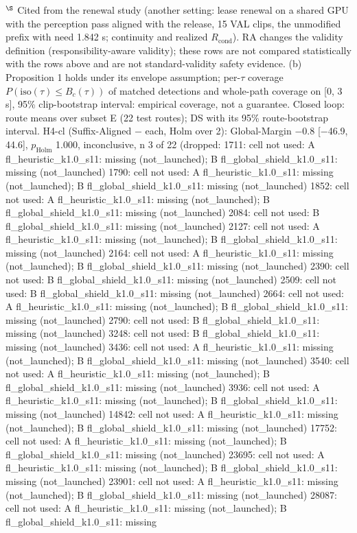 \begin{table}[t]
{$^\S$ Cited from the renewal study (another setting: lease renewal on a shared GPU with the perception pass aligned with the release, 15 VAL clips, the unmodified prefix with need 1.842 s; continuity and realized $R_\mathrm{cond}$). RA changes the validity definition (responsibility-aware validity); these rows are not compared statistically with the rows above and are not standard-validity safety evidence. 
(b) Proposition 1 holds under its envelope assumption; per-$\tau$ coverage $P(\mathrm{iso}(\tau) \le B_c(\tau))$ of matched detections and whole-path coverage on [0, 3 s], 95\% clip-bootstrap interval: empirical coverage, not a guarantee. 
Closed loop: route means over subset E (22 test routes); DS with its 95\% route-bootstrap interval. H4-cl (Suffix-Aligned $-$ each, Holm over 2): Global-Margin $-$0.8 [$-$46.9, 44.6], $p_\mathrm{Holm}$ 1.000, inconclusive, n 3 of 22 (dropped: 1711: cell not used: A fl\_heuristic\_k1.0\_s11: missing (not\_launched); B fl\_global\_shield\_k1.0\_s11: missing (not\_launched) \textbar{} 1790: cell not used: A fl\_heuristic\_k1.0\_s11: missing (not\_launched); B fl\_global\_shield\_k1.0\_s11: missing (not\_launched) \textbar{} 1852: cell not used: A fl\_heuristic\_k1.0\_s11: missing (not\_launched); B fl\_global\_shield\_k1.0\_s11: missing (not\_launched) \textbar{} 2084: cell not used: B fl\_global\_shield\_k1.0\_s11: missing (not\_launched) \textbar{} 2127: cell not used: A fl\_heuristic\_k1.0\_s11: missing (not\_launched); B fl\_global\_shield\_k1.0\_s11: missing (not\_launched) \textbar{} 2164: cell not used: A fl\_heuristic\_k1.0\_s11: missing (not\_launched); B fl\_global\_shield\_k1.0\_s11: missing (not\_launched) \textbar{} 2390: cell not used: B fl\_global\_shield\_k1.0\_s11: missing (not\_launched) \textbar{} 2509: cell not used: B fl\_global\_shield\_k1.0\_s11: missing (not\_launched) \textbar{} 2664: cell not used: A fl\_heuristic\_k1.0\_s11: missing (not\_launched); B fl\_global\_shield\_k1.0\_s11: missing (not\_launched) \textbar{} 2790: cell not used: B fl\_global\_shield\_k1.0\_s11: missing (not\_launched) \textbar{} 3248: cell not used: B fl\_global\_shield\_k1.0\_s11: missing (not\_launched) \textbar{} 3436: cell not used: A fl\_heuristic\_k1.0\_s11: missing (not\_launched); B fl\_global\_shield\_k1.0\_s11: missing (not\_launched) \textbar{} 3540: cell not used: A fl\_heuristic\_k1.0\_s11: missing (not\_launched); B fl\_global\_shield\_k1.0\_s11: missing (not\_launched) \textbar{} 3936: cell not used: A fl\_heuristic\_k1.0\_s11: missing (not\_launched); B fl\_global\_shield\_k1.0\_s11: missing (not\_launched) \textbar{} 14842: cell not used: A fl\_heuristic\_k1.0\_s11: missing (not\_launched); B fl\_global\_shield\_k1.0\_s11: missing (not\_launched) \textbar{} 17752: cell not used: A fl\_heuristic\_k1.0\_s11: missing (not\_launched); B fl\_global\_shield\_k1.0\_s11: missing (not\_launched) \textbar{} 23695: cell not used: A fl\_heuristic\_k1.0\_s11: missing (not\_launched); B fl\_global\_shield\_k1.0\_s11: missing (not\_launched) \textbar{} 23901: cell not used: A fl\_heuristic\_k1.0\_s11: missing (not\_launched); B fl\_global\_shield\_k1.0\_s11: missing (not\_launched) \textbar{} 28087: cell not used: A fl\_heuristic\_k1.0\_s11: missing (not\_launched); B fl\_global\_shield\_k1.0\_s11: missing }
\end{table}

